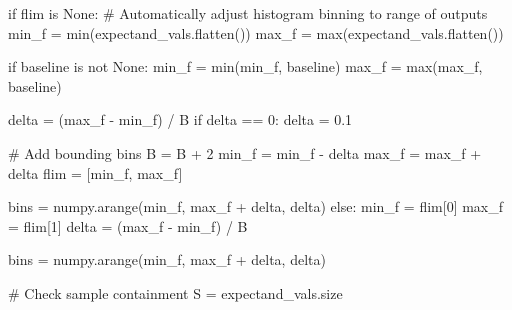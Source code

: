 \documentclass[
  letterpaper,
  DIV=11,
  numbers=noendperiod]{scrartcl}
\newenvironment{Shaded}{\begin{snugshade}}{\end{snugshade}}
\newcommand{\BuiltInTok}[1]{\textcolor[rgb]{0.00,0.23,0.31}{#1}}
\newcommand{\CommentTok}[1]{\textcolor[rgb]{0.37,0.37,0.37}{#1}}
\newcommand{\ControlFlowTok}[1]{\textcolor[rgb]{0.00,0.23,0.31}{#1}}
\newcommand{\DecValTok}[1]{\textcolor[rgb]{0.68,0.00,0.00}{#1}}
\newcommand{\FloatTok}[1]{\textcolor[rgb]{0.68,0.00,0.00}{#1}}
\newcommand{\KeywordTok}[1]{\textcolor[rgb]{0.00,0.23,0.31}{#1}}
\newcommand{\NormalTok}[1]{\textcolor[rgb]{0.00,0.23,0.31}{#1}}
\newcommand{\OperatorTok}[1]{\textcolor[rgb]{0.37,0.37,0.37}{#1}}
\newcommand{\VariableTok}[1]{\textcolor[rgb]{0.07,0.07,0.07}{#1}}
\begin{document}
\begin{Shaded}
\begin{Highlighting}[]
  \ControlFlowTok{if}\NormalTok{ flim }\KeywordTok{is} \VariableTok{None}\NormalTok{:}
    \CommentTok{\# Automatically adjust histogram binning to range of outputs}
\NormalTok{    min\_f }\OperatorTok{=} \BuiltInTok{min}\NormalTok{(expectand\_vals.flatten())}
\NormalTok{    max\_f }\OperatorTok{=} \BuiltInTok{max}\NormalTok{(expectand\_vals.flatten())}

    \ControlFlowTok{if}\NormalTok{ baseline }\KeywordTok{is} \KeywordTok{not} \VariableTok{None}\NormalTok{:}
\NormalTok{      min\_f }\OperatorTok{=} \BuiltInTok{min}\NormalTok{(min\_f, baseline)}
\NormalTok{      max\_f }\OperatorTok{=} \BuiltInTok{max}\NormalTok{(max\_f, baseline)}

\NormalTok{    delta }\OperatorTok{=}\NormalTok{ (max\_f }\OperatorTok{{-}}\NormalTok{ min\_f) }\OperatorTok{/}\NormalTok{ B}
    \ControlFlowTok{if}\NormalTok{ delta }\OperatorTok{==} \DecValTok{0}\NormalTok{:}
\NormalTok{      delta }\OperatorTok{=} \FloatTok{0.1}

    \CommentTok{\# Add bounding bins}
\NormalTok{    B }\OperatorTok{=}\NormalTok{ B }\OperatorTok{+} \DecValTok{2}
\NormalTok{    min\_f }\OperatorTok{=}\NormalTok{ min\_f }\OperatorTok{{-}}\NormalTok{ delta}
\NormalTok{    max\_f }\OperatorTok{=}\NormalTok{ max\_f }\OperatorTok{+}\NormalTok{ delta}
\NormalTok{    flim }\OperatorTok{=}\NormalTok{ [min\_f, max\_f]}
    
\NormalTok{    bins }\OperatorTok{=}\NormalTok{ numpy.arange(min\_f, max\_f }\OperatorTok{+}\NormalTok{ delta, delta)}
  \ControlFlowTok{else}\NormalTok{:}
\NormalTok{    min\_f }\OperatorTok{=}\NormalTok{ flim[}\DecValTok{0}\NormalTok{]}
\NormalTok{    max\_f }\OperatorTok{=}\NormalTok{ flim[}\DecValTok{1}\NormalTok{]}
\NormalTok{    delta }\OperatorTok{=}\NormalTok{ (max\_f }\OperatorTok{{-}}\NormalTok{ min\_f) }\OperatorTok{/}\NormalTok{ B}

\NormalTok{    bins }\OperatorTok{=}\NormalTok{ numpy.arange(min\_f, max\_f }\OperatorTok{+}\NormalTok{ delta, delta)}
  
  \CommentTok{\# Check sample containment}
\NormalTok{  S }\OperatorTok{=}\NormalTok{ expectand\_vals.size}


\end{Highlighting}
\end{Shaded}
\end{document}
